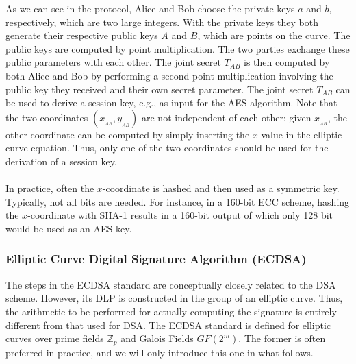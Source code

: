 As we can see in the protocol, Alice and Bob choose the private keys $a$ and $b$, respectively, which are two large integers. With the private keys they both generate their respective public keys $A$ and $B$, which are points on the curve. The public keys are computed by point multiplication. The two parties exchange these public parameters with each other. The joint secret $T_{AB}$ is then computed by both Alice and Bob by performing a second point multiplication involving the public key they received and their own secret parameter. The joint secret $T_{AB}$ can be used to derive a session key, e.g., as input for the AES algorithm. Note that the two coordinates $(x_{_{AB}},y_{_{AB}})$ are not independent of each other: given $x_{_{AB}}$, the other coordinate can be computed by simply inserting the $x$ value in the elliptic curve equation. Thus, only one of the two coordinates should be used for the derivation of a session key.\\\\
In practice, often the $x$-coordinate is hashed and then used as a symmetric key. Typically, not all bits are needed. For instance, in a 160-bit ECC scheme, hashing the $x$-coordinate with SHA-1 results in a 160-bit output of which only 128 bit would be used as an AES key.

\newpage
\subsubsection{Elliptic Curve Digital Signature Algorithm (ECDSA)}
The steps in the ECDSA standard are conceptually closely related to the DSA scheme. However, its DLP is constructed in the group of an elliptic curve. Thus, the arithmetic to be performed for actually computing the signature is entirely different from that used for DSA. The ECDSA standard is defined for elliptic curves over prime fields $\mathbb{Z}_p$ and Galois Fields $GF(2^m)$. The former  is often preferred in practice, and we will only introduce this one in what follows.

